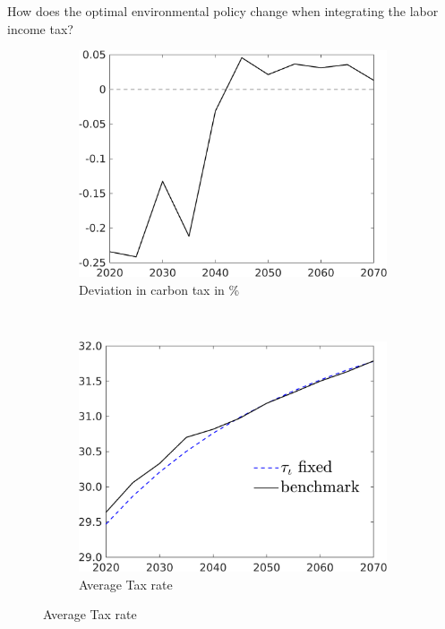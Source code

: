 \documentclass[11pt,aspectratio=169]{beamer}
\begin{document}
\begin{frame}{How does the optimal environmental policy change when integrating the labor income tax?}
	\begin{figure}[h!!]
		\centering
		\begin{subfigure}{0.4\textwidth}		
			\caption{{Deviation in carbon tax in \%}}
			\includegraphics[width=1\textwidth]{../codding_model/own_basedOnFried/optimalPol_010922_revision/figures/all_13Sept22/NewCalib_polTaulFixedPer_T_Tauf_Sun2_emnet1_spillover0_knspil3_xgr0_nsk0_sep0_extern0_PV1_etaa0.79.png}
		\end{subfigure}
		\begin{minipage}[]{0.1\textwidth}
			\
		\end{minipage}
		\begin{subfigure}{0.4\textwidth}		
			\caption{{Average Tax rate}}
			\includegraphics[width=1\textwidth]{../codding_model/own_basedOnFried/optimalPol_010922_revision/figures/all_13Sept22/NewCalib_polTaulFixed_T_dTaulAvS_Sun2_emnet1_spillover0_knspil3_xgr0_nsk0_sep0_extern0_PV1_etaa0.79_lgd1.png}

\end{subfigure}
\end{figure}
\end{frame}
\end{document}
